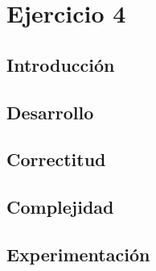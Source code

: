 \section{Ejercicio 4}

\subsection{Introducción}

\subsection{Desarrollo}


\subsection{Correctitud}



\subsection{Complejidad}








\subsection{Experimentación}
